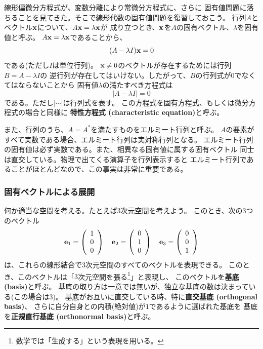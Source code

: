 \documentclass{jarticle}
\begin{document}
線形偏微分方程式が、変数分離により常微分方程式に、さらに
固有値問題に落ちることを見てきた。そこで線形代数の固有値問題を復習しておこう。
行列$A$とベクトル${\bf x}$について、$A {\bf x} = \lambda {\bf x}$が
成り立つとき、${\bf x}$を$A$の固有ベクトル、$\lambda$を固有値と呼ぶ。
$A {\bf x} = \lambda {\bf x}$であることから、
\begin{equation}
  (A - \lambda I) {\bf x} = 0
\end{equation}
である(ただし$I$は単位行列)。
${\bf x} \ne 0$のベクトルが存在するためには行列$B = A - \lambda I$の
逆行列が存在してはいけない。したがって、$B$の行列式が$0$でなくてはならないことから
固有値$\lambda$の満たすべき方程式は
\begin{equation}
  |A - \lambda I|=0
\end{equation}
である。ただし$|\cdots|$は行列式を表す。
この方程式を固有方程式、もしくは微分方程式の場合と同様に
{\bf 特性方程式 (characteristic equation)}と呼ぶ。

また、行列のうち、$A=A^*$を満たすものをエルミート行列と呼ぶ。
$A$の要素がすべて実数である場合、エルミート行列は実対称行列となる。
エルミート行列の固有値は必ず実数である。また、相異なる固有値に属する固有ベクトル
同士は直交している。物理で出てくる演算子を行列表示すると
エルミート行列であることがほとんどなので、この事実は非常に重要である。

\subsubsection{固有ベクトルによる展開}

何か適当な空間を考える。たとえば$3$次元空間を考えよう。
このとき、次の3つのベクトル
\begin{equation}
  {\bf e}_1 =
  \left(
  \begin{array}{c}
      1 \\ 0 \\ 0
    \end{array}
  \right)
  \quad
  {\bf e}_2 =
  \left(
  \begin{array}{c}
      0 \\ 1 \\ 0
    \end{array}
  \right)
  \quad
  {\bf e}_3 =
  \left(
  \begin{array}{c}
      0 \\ 0 \\ 1
    \end{array}
  \right)
\end{equation}
は、これらの線形結合で$3$次元空間のすべてのベクトルを表現できる。
このとき、このベクトルは「$3$次元空間を張る\footnote{
  数学では「生成する」という表現を用いる。
}」と表現し、
このベクトルを{\bf 基底 (basis)}と呼ぶ。
基底の取り方は一意では無いが、独立な基底の数は決まっている(この場合は3)。
基底がお互いに直交している時、特に{\bf 直交基底 (orthogonal basis)}、
さらに自分自身との内積(絶対値)が$1$であるように選ばれた基底を
基底を{\bf 正規直行基底 (orthonormal basis)}と呼ぶ。
\end{document}
